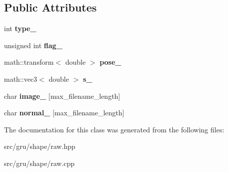 \subsection*{\-Public \-Attributes}
\begin{DoxyCompactItemize}
\item 
\hypertarget{classglutpp_1_1shape_1_1raw__base_af7ed7c2efa3da8a0b6e87c6be135a1a4}{int {\bfseries type\-\_\-}}\label{classglutpp_1_1shape_1_1raw__base_af7ed7c2efa3da8a0b6e87c6be135a1a4}

\item 
\hypertarget{classglutpp_1_1shape_1_1raw__base_ad5720e2c69804c5780d46f9d684ceea7}{unsigned int {\bfseries flag\-\_\-}}\label{classglutpp_1_1shape_1_1raw__base_ad5720e2c69804c5780d46f9d684ceea7}

\item 
\hypertarget{classglutpp_1_1shape_1_1raw__base_a84503be2cb8317adc9f1d53751e6b582}{math\-::transform$<$ double $>$ {\bfseries pose\-\_\-}}\label{classglutpp_1_1shape_1_1raw__base_a84503be2cb8317adc9f1d53751e6b582}

\item 
\hypertarget{classglutpp_1_1shape_1_1raw__base_a8d1175e0747b91481c7b74f58b6f7046}{math\-::vec3$<$ double $>$ {\bfseries s\-\_\-}}\label{classglutpp_1_1shape_1_1raw__base_a8d1175e0747b91481c7b74f58b6f7046}

\item 
\hypertarget{classglutpp_1_1shape_1_1raw__base_adee4f2b32fb589e42335c71de5eea6ad}{char {\bfseries image\-\_\-} \mbox{[}max\-\_\-filename\-\_\-length\mbox{]}}\label{classglutpp_1_1shape_1_1raw__base_adee4f2b32fb589e42335c71de5eea6ad}

\item 
\hypertarget{classglutpp_1_1shape_1_1raw__base_a1bc85077b2981960c6cde84df7af92c9}{char {\bfseries normal\-\_\-} \mbox{[}max\-\_\-filename\-\_\-length\mbox{]}}\label{classglutpp_1_1shape_1_1raw__base_a1bc85077b2981960c6cde84df7af92c9}

\end{DoxyCompactItemize}


\-The documentation for this class was generated from the following files\-:\begin{DoxyCompactItemize}
\item 
src/gru/shape/raw.\-hpp\item 
src/gru/shape/raw.\-cpp\end{DoxyCompactItemize}
